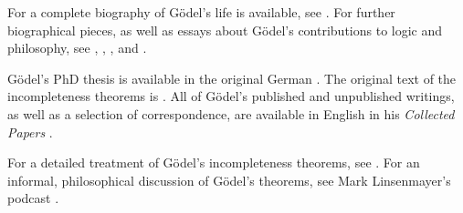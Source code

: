 \documentclass[../../../include/open-logic-section]{subfiles}
\begin{document}
\begin{reading}
For a complete biography of G{\"o}del's life is available, see
\cite{Dawson1997}. For further biographical pieces, as well as essays
about G{\"o}del's contributions to logic and philosophy, see
\cite{Wang1990}, \cite{Baaz2011}, \cite{Takeuti2003}, and
\cite{Sigmund2007}.

G{\"o}del's PhD thesis is available in the original German
\cite{Godel1929}.  The original text of the incompleteness theorems
is \cite{Godel1931}. All of G\"odel's published and unpublished
writings, as well as a selection of correspondence, are available in
English in his \emph{Collected Papers} \cite{Godel1986,Godel1990}.

For a detailed treatment of G{\"o}del's incompleteness theorems, see
\cite{Smith2013}. For an informal, philosophical discussion of
G{\"o}del's theorems, see Mark Linsenmayer's podcast
\cite{Linsenmayer2014}.
\end{reading}
\end{document}
